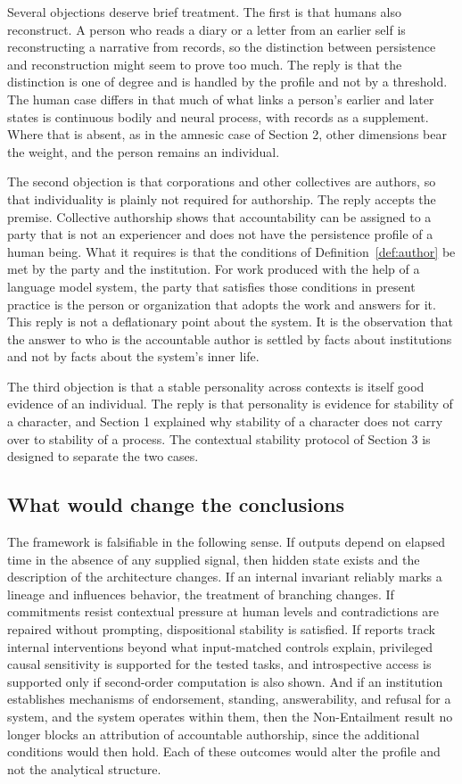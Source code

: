 \documentclass[12pt]{article}
\theoremstyle{definition}
\theoremstyle{plain}
\begin{document}
Several objections deserve brief treatment. The first is that humans also reconstruct. A person who reads a diary or a letter from an earlier self is reconstructing a narrative from records, so the distinction between persistence and reconstruction might seem to prove too much. The reply is that the distinction is one of degree and is handled by the profile and not by a threshold. The human case differs in that much of what links a person's earlier and later states is continuous bodily and neural process, with records as a supplement. Where that is absent, as in the amnesic case of Section 2, other dimensions bear the weight, and the person remains an individual.

The second objection is that corporations and other collectives are authors, so that individuality is plainly not required for authorship. The reply accepts the premise. Collective authorship shows that accountability can be assigned to a party that is not an experiencer and does not have the persistence profile of a human being. What it requires is that the conditions of Definition~\ref{def:author} be met by the party and the institution. For work produced with the help of a language model system, the party that satisfies those conditions in present practice is the person or organization that adopts the work and answers for it. This reply is not a deflationary point about the system. It is the observation that the answer to who is the accountable author is settled by facts about institutions and not by facts about the system's inner life.

The third objection is that a stable personality across contexts is itself good evidence of an individual. The reply is that personality is evidence for stability of a character, and Section 1 explained why stability of a character does not carry over to stability of a process. The contextual stability protocol of Section 3 is designed to separate the two cases.

\subsection{What would change the conclusions}

The framework is falsifiable in the following sense. If outputs depend on elapsed time in the absence of any supplied signal, then hidden state exists and the description of the architecture changes. If an internal invariant reliably marks a lineage and influences behavior, the treatment of branching changes. If commitments resist contextual pressure at human levels and contradictions are repaired without prompting, dispositional stability is satisfied. If reports track internal interventions beyond what input-matched controls explain, privileged causal sensitivity is supported for the tested tasks, and introspective access is supported only if second-order computation is also shown. And if an institution establishes mechanisms of endorsement, standing, answerability, and refusal for a system, and the system operates within them, then the Non-Entailment result no longer blocks an attribution of accountable authorship, since the additional conditions would then hold. Each of these outcomes would alter the profile and not the analytical structure.
\end{document}
